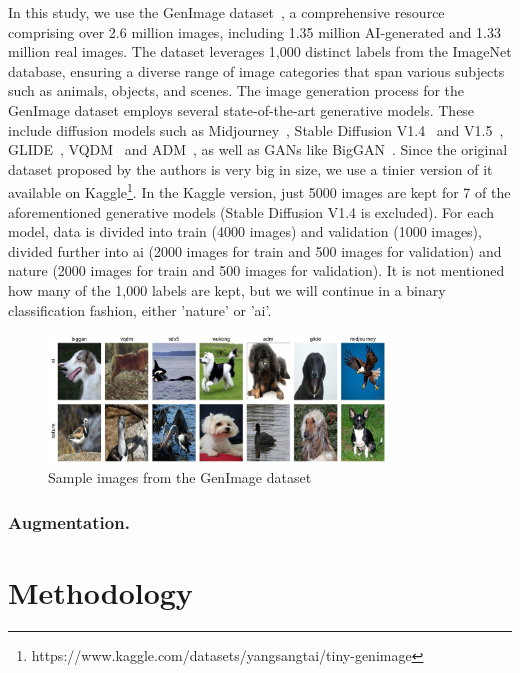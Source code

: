 \documentclass[runningheads]{llncs}
\begin{document}
In this study, we use the GenImage dataset~\cite{zhu2023genimage}, a comprehensive resource comprising over 2.6 million images, including 1.35 million AI-generated and 1.33 million real images. The dataset leverages 1,000 distinct labels from the ImageNet database, ensuring a diverse range of image categories that span various subjects such as animals, objects, and scenes. The image generation process for the GenImage dataset employs several state-of-the-art generative models. These include diffusion models such as Midjourney~\cite{midjourney}, Stable Diffusion V1.4~\cite{robin2022sd} and V1.5~\cite{robin2022sd}, GLIDE~\cite{nichol2022glide}, VQDM~\cite{shuyang2022vqdm} and ADM~\cite{dhariwal2021adm}, as well as GANs like BigGAN~\cite{brock2019largescalegantraining}. Since the original dataset proposed by the authors is very big in size, we use a tinier version of it available on Kaggle\footnote{https://www.kaggle.com/datasets/yangsangtai/tiny-genimage}. In the Kaggle version, just 5000 images are kept for 7 of the aforementioned generative models (Stable Diffusion V1.4 is excluded). For each model, data is divided into train (4000 images) and validation (1000 images), divided further into ai (2000 images for train and 500 images for validation) and nature (2000 images for train and 500 images for validation). It is not mentioned how many of the 1,000 labels are kept, but we will continue in a binary classification fashion, either 'nature' or 'ai'.

\begin{figure}[ht]
    \centering
    \includegraphics[width=0.8\textwidth]{graphics/dataset_sample.jpeg}
    \caption{Sample images from the GenImage dataset}
    \label{fig:dataset-sample}
\end{figure}


\subsubsection{Augmentation.}
%
%
\section{Methodology}
\end{document}
